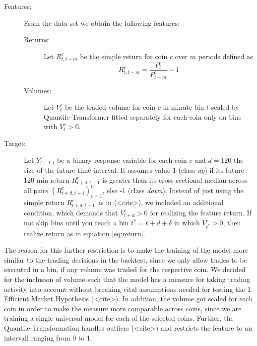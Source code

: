 \begin{description}
    \item[Features:] From the data set we obtain the following features:
    \begin{description}
        \item[Returns:] Let $ R^{c}_{t, t - m} $ be the simple return for coin $ c $ over $ m $ periods defined as
        \begin{equation}
            \label{eq:return}
            R^{c}_{t, t - m} = \frac{ P^{c}_{t} }{ P^{c}_{t - m} } - 1 
        \end{equation} 
        \item[Volumes:] {
            Let $ V^{c}_{t} $ be the traded volume for coin $ c $ in minute-bin $ t $ scaled by Quantile-Transformer 
            fitted separately for each coin only on bins with $ V^{c}_{t} > 0 $. 
        }
    \end{description}
    \item[Target:] {
        Let $ Y^{c}_{t + 1, t} $ be a binary response variable for each coin $c$ 
        and $ d = 120 $ the size of the future time interval. 
        It assumes value 1 (class \textit{up}) if its future 120 min return $ R^{c}_{t + d, t + 1} $ is greater 
        than its cross-sectional median across all pairs $ ( R^{c}_{t + d, t + 1} )^{n}_{c=1} $, 
        else -1 (class \textit{down}). 
        Instead of just using the simple return $ R^{c}_{t + d, t + 1} $ as in (<cite>), 
        we included an additional condition, which demands that $  V^{c}_{t + d} > 0 $ for realizing the feature return.
        If not skip bins until you reach a bin $ t^{*} = t + d + \delta $  in which $  V^{c}_{ t^{*} } > 0 $, 
        then realize return as in equation \ref{eq:return}.
    }
\end{description}


The reason for this further restriction is to make the training of the model more similar to the 
trading decisions in the backtest, since we only allow trades to be executed in a bin, 
if any volume was traded for the respective coin.
We decided for the inclusion of volume such that the model has a measure for 
taking trading activity into account without breaking vital assumptions needed for testing the 1. Efficient Market Hypothesis (<cite>).
In addition, the volume got scaled for each coin in order to make the measure more comparable across coins,
since we are training a single universal model for each of the selected coins. 
Further, the Quantile-Transformation handles outliers (<cite>) and restricts the feature to an intervall ranging from 0 to 1.


